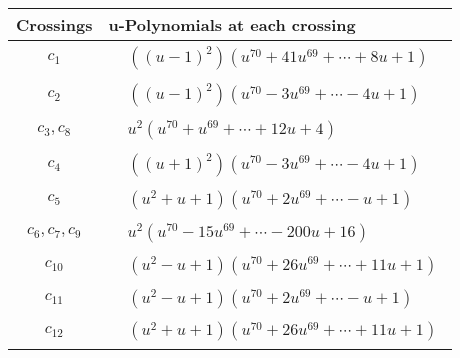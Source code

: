 \documentclass[1p]{elsarticle_modified}
\theoremstyle{definition}
\begin{document}
\begin{tabular}{m{50pt}|m{274pt}}
Crossings & \hspace{64pt}u-Polynomials at each crossing \\
\hline $$\begin{aligned}c_{1}\end{aligned}$$&$\begin{aligned}
&((u-1)^2)(u^{70}+41 u^{69}+\cdots+8 u+1)
\end{aligned}$\\
\hline $$\begin{aligned}c_{2}\end{aligned}$$&$\begin{aligned}
&((u-1)^2)(u^{70}-3 u^{69}+\cdots-4 u+1)
\end{aligned}$\\
\hline $$\begin{aligned}c_{3},c_{8}\end{aligned}$$&$\begin{aligned}
&u^2(u^{70}+u^{69}+\cdots+12 u+4)
\end{aligned}$\\
\hline $$\begin{aligned}c_{4}\end{aligned}$$&$\begin{aligned}
&((u+1)^2)(u^{70}-3 u^{69}+\cdots-4 u+1)
\end{aligned}$\\
\hline $$\begin{aligned}c_{5}\end{aligned}$$&$\begin{aligned}
&(u^2+u+1)(u^{70}+2 u^{69}+\cdots- u+1)
\end{aligned}$\\
\hline $$\begin{aligned}c_{6},c_{7},c_{9}\end{aligned}$$&$\begin{aligned}
&u^2(u^{70}-15 u^{69}+\cdots-200 u+16)
\end{aligned}$\\
\hline $$\begin{aligned}c_{10}\end{aligned}$$&$\begin{aligned}
&(u^2- u+1)(u^{70}+26 u^{69}+\cdots+11 u+1)
\end{aligned}$\\
\hline $$\begin{aligned}c_{11}\end{aligned}$$&$\begin{aligned}
&(u^2- u+1)(u^{70}+2 u^{69}+\cdots- u+1)
\end{aligned}$\\
\hline $$\begin{aligned}c_{12}\end{aligned}$$&$\begin{aligned}
&(u^2+u+1)(u^{70}+26 u^{69}+\cdots+11 u+1)
\end{aligned}$\\
\hline
\end{tabular}\newpage\renewcommand{\arraystretch}{1}
\end{document}
